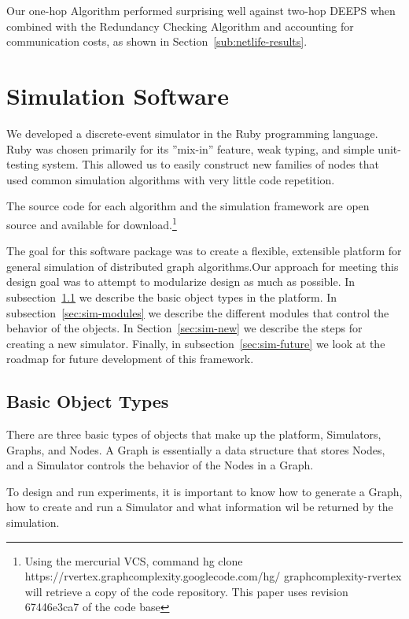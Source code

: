 \documentclass[technote, 10pt, letter]{IEEEtran}
\begin{document}
Our one-hop Algorithm performed surprising well against two-hop DEEPS when combined with the Redundancy Checking Algorithm and accounting for communication costs, as shown in Section~\ref{sub:netlife-results}.




\section{Simulation Software}
\label{sec:simulator}

We developed a discrete-event simulator in the Ruby programming language. Ruby was chosen primarily for its ''mix-in'' feature, weak typing, and simple unit-testing system. This allowed us to easily construct new families of nodes that used common simulation algorithms with very little code repetition.

The source code for each algorithm and the simulation framework are open source and available for download.\footnote{Using the mercurial VCS, command hg clone https://rvertex.graphcomplexity.googlecode.com/hg/ graphcomplexity-rvertex will retrieve a copy of the code repository. This paper uses revision 67446e3ca7 of the code base} 

The goal for this software package was to create a flexible, extensible platform for general simulation of distributed graph algorithms.Our approach for meeting this design goal was to attempt to modularize design as much as possible. In subsection~\ref{sec:sim-objects} we describe the basic object types in the platform. In subsection~\ref{sec:sim-modules} we describe the different modules that control the behavior of the objects. In Section~\ref{sec:sim-new} we describe the steps for creating a new simulator. Finally, in subsection~\ref{sec:sim-future} we look at the roadmap for future development of this framework.

\subsection{Basic Object Types}
\label{sec:sim-objects}

There are three basic types of objects that make up the platform, Simulators, Graphs, and Nodes. A Graph is essentially a data structure that stores Nodes, and a Simulator controls the behavior of the Nodes in a Graph. 

To design and run experiments, it is important to know how to generate a Graph, how to create and run a Simulator and what information wil be returned by the simulation. 
\end{document}
